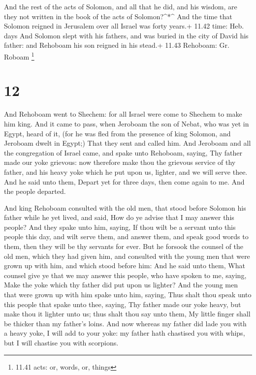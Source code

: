  And the rest of the acts of Solomon, and all that he did,
and his wisdom, are they not written in the book of the acts of
Solomon?\^{}*\^{}  And the time that Solomon reigned in
Jerusalem over all Israel was forty years.+ 11.42 time: Heb. days
 And Solomon slept with his fathers, and was buried in the
city of David his father: and Rehoboam his son reigned in his stead.+
11.43 Rehoboam: Gr. Roboam \footnote{11.41 acts: or, words, or, things}

\hypertarget{section-11}{%
\section{12}\label{section-11}}

 And Rehoboam went to Shechem: for all Israel were come to
Shechem to make him king.  And it came to pass, when
Jeroboam the son of Nebat, who was yet in Egypt, heard of it, (for he
was fled from the presence of king Solomon, and Jeroboam dwelt in
Egypt;)  That they sent and called him. And Jeroboam and all
the congregation of Israel came, and spake unto Rehoboam, saying,
 Thy father made our yoke grievous: now therefore make thou
the grievous service of thy father, and his heavy yoke which he put upon
us, lighter, and we will serve thee.  And he said unto them,
Depart yet for three days, then come again to me. And the people
departed.

 And king Rehoboam consulted with the old men, that stood
before Solomon his father while he yet lived, and said, How do ye advise
that I may answer this people?  And they spake unto him,
saying, If thou wilt be a servant unto this people this day, and wilt
serve them, and answer them, and speak good words to them, then they
will be thy servants for ever.  But he forsook the counsel
of the old men, which they had given him, and consulted with the young
men that were grown up with him, and which stood before him:
 And he said unto them, What counsel give ye that we may
answer this people, who have spoken to me, saying, Make the yoke which
thy father did put upon us lighter?  And the young men that
were grown up with him spake unto him, saying, Thus shalt thou speak
unto this people that spake unto thee, saying, Thy father made our yoke
heavy, but make thou it lighter unto us; thus shalt thou say unto them,
My little finger shall be thicker than my father's loins. 
And now whereas my father did lade you with a heavy yoke, I will add to
your yoke: my father hath chastised you with whips, but I will chastise
you with scorpions.


